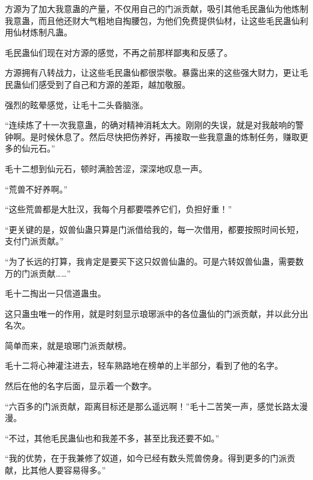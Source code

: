 \begin{this_body}
方源为了加大我意蛊的产量，不仅用自己的门派贡献，吸引其他毛民蛊仙为他炼制我意蛊，而且他还财大气粗地自掏腰包，为他们免费提供仙材，让这些毛民蛊仙利用仙材炼制凡蛊。

毛民蛊仙们现在对方源的感觉，不再之前那样鄙夷和反感了。

方源拥有八转战力，让这些毛民蛊仙都很崇敬。暴露出来的这些强大财力，更让毛民蛊仙们感受到了自己和方源的差距，越加敬服。

强烈的眩晕感觉，让毛十二头昏脑涨。

“连续炼了十一次我意蛊，的确对精神消耗太大。刚刚的失误，就是对我敲响的警钟啊。是时候休息了。然后尽快把伤养好，再接取一些我意蛊的炼制任务，赚取更多的仙元石。”

毛十二想到仙元石，顿时满脸苦涩，深深地叹息一声。

“荒兽不好养啊。”

“这些荒兽都是大肚汉，我每个月都要喂养它们，负担好重！”

“更关键的是，奴兽仙蛊只算是门派借给我的，每一次借用，都要按照时间长短，支付门派贡献。”

“为了长远的打算，我肯定是要买下这只奴兽仙蛊的。可是六转奴兽仙蛊，需要数万的门派贡献……”

毛十二掏出一只信道蛊虫。

这只蛊虫唯一的作用，就是时刻显示琅琊派中的各位蛊仙的门派贡献，并以此分出名次。

简单而来，就是琅琊门派贡献榜。

毛十二将心神灌注进去，轻车熟路地在榜单的上半部分，看到了他的名字。

然后在他的名字后面，显示着一个数字。

“六百多的门派贡献，距离目标还是那么遥远啊！”毛十二苦笑一声，感觉长路太漫漫。

“不过，其他毛民蛊仙也和我差不多，甚至比我还要不如。”

“我的优势，在于我兼修了奴道，如今已经有数头荒兽傍身。得到更多的门派贡献，比其他人要容易得多。”

\end{this_body}

